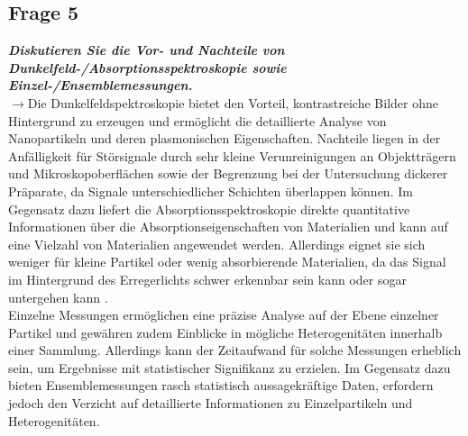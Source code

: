 \subsection{\label{subsec:FZV5}Frage 5}
\textbf{\textit{Diskutieren Sie die Vor- und Nachteile von Dunkelfeld-/Absorptionsspektroskopie
sowie Einzel-/Ensemblemessungen.}} \\
$\rightarrow$Die Dunkelfeldspektroskopie bietet den Vorteil, kontrastreiche Bilder ohne Hintergrund zu 
erzeugen und ermöglicht die detaillierte Analyse von Nanopartikeln und deren plasmonischen Eigenschaften. 
Nachteile liegen in der Anfälligkeit für Störsignale durch sehr kleine Verunreinigungen an Objektträgern 
und Mikroskopoberflächen sowie der Begrenzung bei der Untersuchung dickerer Präparate, 
da Signale unterschiedlicher Schichten überlappen können. 
Im Gegensatz dazu liefert die Absorptionsspektroskopie direkte quantitative Informationen über die 
Absorptionseigenschaften von Materialien und kann auf eine Vielzahl von Materialien angewendet werden. 
Allerdings eignet sie sich weniger für kleine Partikel oder wenig absorbierende Materialien, 
da das Signal im Hintergrund des Erregerlichts schwer erkennbar sein kann oder sogar untergehen kann \cite{FZV5}.\\
Einzelne Messungen ermöglichen eine präzise Analyse auf der Ebene einzelner Partikel und gewähren zudem Einblicke 
in mögliche Heterogenitäten innerhalb einer Sammlung. 
Allerdings kann der Zeitaufwand für solche Messungen erheblich sein, um Ergebnisse mit statistischer 
Signifikanz zu erzielen. 
Im Gegensatz dazu bieten Ensemblemessungen rasch statistisch aussagekräftige Daten, 
erfordern jedoch den Verzicht auf detaillierte Informationen zu Einzelpartikeln und Heterogenitäten.